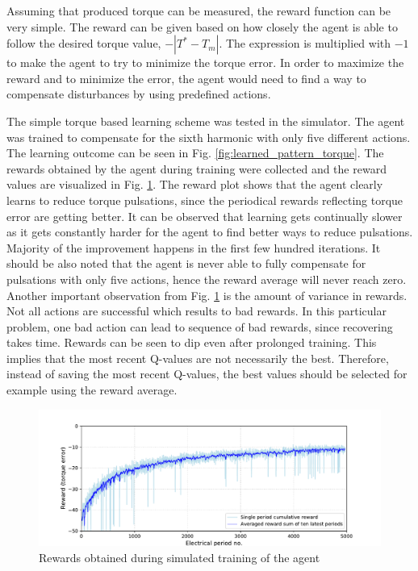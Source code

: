 Assuming that produced torque can be measured, the reward function can be very simple. The reward can be given based on how closely the agent is able to follow the desired torque value, $-|T^* - T_m|$. The expression is multiplied with $-1$ to make the agent to try to minimize the torque error. In order to maximize the reward and to minimize the error, the agent would need to find a way to compensate disturbances by using predefined actions.

The simple torque based learning scheme was tested in the simulator. The agent was trained to compensate for the sixth harmonic with only five different actions. The learning outcome can be seen in Fig. \ref{fig:learned_pattern_torque}. The rewards obtained by the agent during training were collected and the reward values are visualized in Fig. \ref{fig:qlr_torque_reward}. The reward plot shows that the agent clearly learns to reduce torque pulsations, since the periodical rewards reflecting torque error are getting better. It can be observed that learning gets continually slower as it gets constantly harder for the agent to find better ways to reduce pulsations. Majority of the improvement happens in the first few hundred iterations. It should be also noted that the agent is never able to fully compensate for pulsations with only five actions, hence the reward average will never reach zero. Another important observation from Fig. \ref{fig:qlr_torque_reward} is the amount of variance in rewards. Not all actions are successful which results to bad rewards. In this particular problem, one bad action can lead to sequence of bad rewards, since recovering takes time. Rewards can be seen to dip even after prolonged training. This implies that the most recent Q-values are not necessarily the best. Therefore, instead of saving the most recent Q-values, the best values should be selected for example using the reward average.
\begin{figure}[tb] 
    \centering
    \includegraphics[width=\textwidth]{images/torque-reward-history.pdf}
    \caption{Rewards obtained during simulated training of the agent}
    \label{fig:qlr_torque_reward}
\end{figure}

